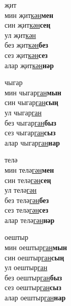 \begin{multicols}{4}
\begin{enumerate}
\begin{minipage}{\linewidth}
    \item
    җит\\
    мин җит\underline{кән}\textbf{мен}\\
    син җит\underline{кән}\textbf{сең}\\
    ул җит\underline{кән}\\
    без җит\underline{кән}\textbf{без}\\
    сез җит\underline{кән}\textbf{сез}\\
    алар җит\underline{кән}\textbf{нәр}\\
\end{minipage}

\begin{minipage}{\linewidth}
    \item
    чыгар\\
    мин чыгар\underline{ган}\textbf{мын}\\
    син чыгар\underline{ган}\textbf{сың}\\
    ул чыгар\underline{ган}\\
    без чыгар\underline{ган}\textbf{быз}\\
    сез чыгар\underline{ган}\textbf{сыз}\\
    алар чыгар\underline{ган}\textbf{нар}\\
\end{minipage}

\begin{minipage}{\linewidth}
    \item
    телә\\
    мин телә\underline{гән}\textbf{мен}\\
    син телә\underline{гән}\textbf{сең}\\
    ул телә\underline{гән}\\
    без телә\underline{гән}\textbf{без}\\
    сез телә\underline{гән}\textbf{сез}\\
    алар телә\underline{гән}\textbf{нәр}\\
\end{minipage}

\begin{minipage}{\linewidth}
    \item
    оештыр\\
    мин оештыр\underline{ган}\textbf{мын}\\
    син оештыр\underline{ган}\textbf{сың}\\
    ул оештыр\underline{ган}\\
    без оештыр\underline{ган}\textbf{быз}\\
    сез оештыр\underline{ган}\textbf{сыз}\\
    алар оештыр\underline{ган}\textbf{нар}\\
\end{minipage}


\end{enumerate}
\end{multicols}

